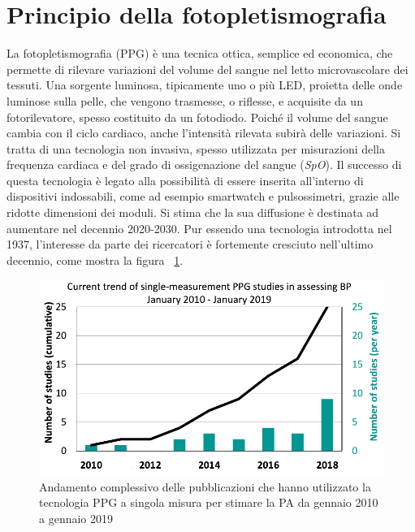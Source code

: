 \section{Principio della fotopletismografia}
La fotopletismografia (PPG) è una tecnica ottica, semplice ed economica, che permette di rilevare variazioni del volume del sangue nel letto microvascolare dei tessuti\cite{Dey2019}. Una sorgente luminosa, tipicamente uno o più LED, proietta delle onde luminose sulla pelle, che vengono trasmesse, o riflesse, e acquisite da un fotorilevatore, spesso costituito da un fotodiodo. Poiché il volume del sangue cambia con il ciclo cardiaco, anche l'intensità rilevata subirà delle variazioni. Si tratta di una tecnologia non invasiva, spesso utilizzata per misurazioni della frequenza cardiaca e del grado di ossigenazione del sangue (\textit{SpO}). Il successo di questa tecnologia è legato alla possibilità di essere inserita all'interno di dispositivi indossabili, come ad esempio smartwatch e pulsossimetri, grazie alle ridotte dimensioni dei moduli. Si stima che la sua diffusione è destinata ad aumentare nel decennio 2020-2030. Pur essendo una tecnologia introdotta nel 1937, l'interesse da parte dei ricercatori è fortemente cresciuto nell'ultimo decennio, come mostra la figura \Fig~\ref{fig:TrendStudies}.
\begin{figure}[h]
	\centering
	\includegraphics[width=0.7\linewidth]{ImageFiles/Fotopletismografia/TrendStudies}
	\caption{Andamento complessivo delle pubblicazioni che hanno utilizzato la tecnologia PPG a singola misura per stimare la PA da gennaio 2010 a gennaio 2019\cite{Hosanee2020}}
	\label{fig:TrendStudies}
\end{figure}
